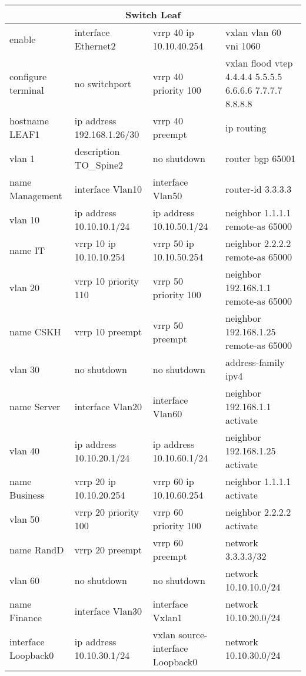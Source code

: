 \begin{table}[H]
\centering
\begin{tabular}{|p{4cm}|p{4cm}|p{4cm}|p{4cm}|}
\hline
\multicolumn{4}{|c|}{Switch Leaf} \\

\hline
 enable	&interface Ethernet2	   &vrrp 40 ip 10.10.40.254&	   vxlan vlan 60 vni 1060\\
configure terminal	   &no switchport	   &vrrp 40 priority 100&	   vxlan flood vtep 4.4.4.4 5.5.5.5 6.6.6.6 7.7.7.7 8.8.8.8\\
hostname LEAF1	   &ip address 192.168.1.26/30	  & vrrp 40 preempt&	ip routing\\
vlan 1	   &description TO\_Spine2	  & no shutdown&	router bgp 65001\\
name Management	&interface Vlan10	&interface Vlan50&	   router-id 3.3.3.3\\
vlan 10	  & ip address 10.10.10.1/24	   &ip address 10.10.50.1/24&	   neighbor 1.1.1.1 remote-as 65000\\
    name IT	   &vrrp 10 ip 10.10.10.254	   &vrrp 50 ip 10.10.50.254&	   neighbor 2.2.2.2 remote-as 65000\\
vlan 20	   &vrrp 10 priority 110	   &vrrp 50 priority 100&	   neighbor 192.168.1.1 remote-as 65000 \\
   name CSKH	  & vrrp 10 preempt	   &vrrp 50 preempt&	   neighbor 192.168.1.25 remote-as 65000\\
vlan 30	   &no shutdown	   &no shutdown&	   address-family ipv4 \\
   name Server	&interface Vlan20	&interface Vlan60&	      neighbor 192.168.1.1 activate\\
vlan 40	  & ip address 10.10.20.1/24	  & ip address 10.10.60.1/24&	      neighbor 192.168.1.25 activate\\
   name Business	   &vrrp 20 ip 10.10.20.254	   &vrrp 60 ip 10.10.60.254&	      neighbor 1.1.1.1 activate\\
vlan 50	   &vrrp 20 priority 100	   &vrrp 60 priority 100&	      neighbor 2.2.2.2 activate\\
   name RandD	   &vrrp 20 preempt	   &vrrp 60 preempt&	   network 3.3.3.3/32\\
vlan 60	  & no shutdown	  & no shutdown&	   network 10.10.10.0/24\\
   name Finance	&interface Vlan30	&interface Vxlan1&	   network 10.10.20.0/24\\
interface Loopback0	  & ip address 10.10.30.1/24	   &vxlan source-interface Loopback0&	   network 10.10.30.0/24\\

\end{tabular}
\end{table}
